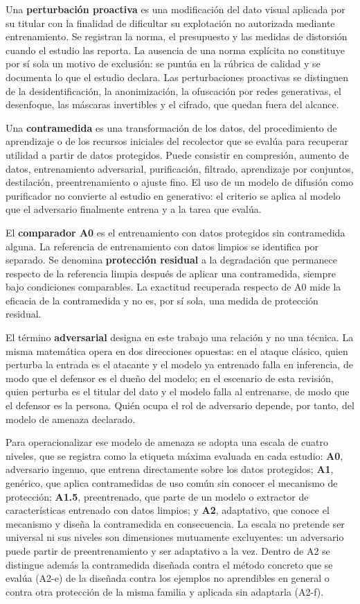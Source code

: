 \documentclass[pdflatex,sn-mathphys-num]{sn-jnl}
\theoremstyle{thmstyleone}
\theoremstyle{thmstyletwo}
\theoremstyle{thmstylethree}
\begin{document}
Una \textbf{perturbación proactiva} es una modificación del dato visual aplicada por su titular con la finalidad de dificultar su explotación no autorizada mediante entrenamiento. Se registran la norma, el presupuesto y las medidas de distorsión cuando el estudio las reporta. La ausencia de una norma explícita no constituye por sí sola un motivo de exclusión: se puntúa en la rúbrica de calidad y se documenta lo que el estudio declara. Las perturbaciones proactivas se distinguen de la desidentificación, la anonimización, la ofuscación por redes generativas, el desenfoque, las máscaras invertibles y el cifrado, que quedan fuera del alcance.

Una \textbf{contramedida} es una transformación de los datos, del procedimiento de aprendizaje o de los recursos iniciales del recolector que se evalúa para recuperar utilidad a partir de datos protegidos. Puede consistir en compresión, aumento de datos, entrenamiento adversarial, purificación, filtrado, aprendizaje por conjuntos, destilación, preentrenamiento o ajuste fino. El uso de un modelo de difusión como purificador no convierte al estudio en generativo: el criterio se aplica al modelo que el adversario finalmente entrena y a la tarea que evalúa.

El \textbf{comparador A0} es el entrenamiento con datos protegidos sin contramedida alguna. La referencia de entrenamiento con datos limpios se identifica por separado. Se denomina \textbf{protección residual} a la degradación que permanece respecto de la referencia limpia después de aplicar una contramedida, siempre bajo condiciones comparables. La exactitud recuperada respecto de A0 mide la eficacia de la contramedida y no es, por sí sola, una medida de protección residual.

El término \textbf{adversarial} designa en este trabajo una relación y no una técnica. La misma matemática opera en dos direcciones opuestas: en el ataque clásico, quien perturba la entrada es el atacante y el modelo ya entrenado falla en inferencia, de modo que el defensor es el dueño del modelo; en el escenario de esta revisión, quien perturba es el titular del dato y el modelo falla al entrenarse, de modo que el defensor es la persona. Quién ocupa el rol de adversario depende, por tanto, del modelo de amenaza declarado.

Para operacionalizar ese modelo de amenaza se adopta una escala de cuatro niveles, que se registra como la etiqueta máxima evaluada en cada estudio: \textbf{A0}, adversario ingenuo, que entrena directamente sobre los datos protegidos; \textbf{A1}, genérico, que aplica contramedidas de uso común sin conocer el mecanismo de protección; \textbf{A1.5}, preentrenado, que parte de un modelo o extractor de características entrenado con datos limpios; y \textbf{A2}, adaptativo, que conoce el mecanismo y diseña la contramedida en consecuencia. La escala no pretende ser universal ni sus niveles son dimensiones mutuamente excluyentes: un adversario puede partir de preentrenamiento y ser adaptativo a la vez. Dentro de A2 se distingue además la contramedida diseñada contra el método concreto que se evalúa (A2-e) de la diseñada contra los ejemplos no aprendibles en general o contra otra protección de la misma familia y aplicada sin adaptarla (A2-f).
\end{document}
